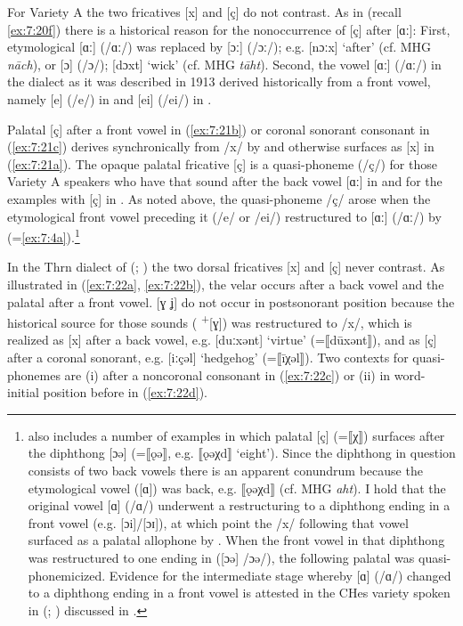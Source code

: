 For Variety A the two fricatives [x] and [ç] do not contrast. As in  (recall \ref{ex:7:20f}) there is a historical reason for the nonoccurrence of [ç] after [ɑː]: First, etymological [ɑː] (/ɑː/) was replaced by [ɔː] (/ɔː/); e.g. [nɔːx] ‘after’ (cf. MHG \textit{nāch}), or [ɔ] (/ɔ/); [dɔxt] ‘wick’ (cf. MHG \textit{tāht}). Second, the vowel [ɑː] (/ɑː/) in the dialect as it was described in 1913 derived historically from a front vowel, namely [e] (/e/) in  and [ei] (/ei/) in .

Palatal [ç] after a front vowel in (\ref{ex:7:21b}) or coronal sonorant consonant in (\ref{ex:7:21c}) derives synchronically from /x/ by  and otherwise surfaces as [x] in (\ref{ex:7:21a}). The opaque palatal fricative [ç] is a quasi-phoneme (/ç/) for those Variety A speakers who have that sound after the back vowel [ɑː] in  and for the examples with [ç] in . As noted above, the quasi-phoneme /ç/ arose when the etymological front vowel preceding it (/e/ or /ei/) restructured to [ɑː] (/ɑː/) by  (=\ref{ex:7:4a}).\footnote{\citet{Glöckner1913} also includes a number of examples in which palatal [ç] (=⟦χ⟧) surfaces after the diphthong [ɔə] (=⟦ǫə⟧, e.g. ⟦ǫəχd⟧ ‘eight’). Since the diphthong in question consists of two back vowels there is an apparent conundrum because the etymological vowel ([ɑ]) was back, e.g. ⟦ǫəχd⟧ (cf. MHG \textit{aht}). I hold that the original vowel [ɑ] (/ɑ/)  underwent a restructuring to a diphthong ending in a front vowel (e.g. [ɔi]/[ɔɪ]), at which point the /x/ following that vowel surfaced as a palatal allophone by . When the front vowel in that diphthong was restructured to one ending in  ([ɔə] /ɔə/), the following palatal was quasi-phonemicized. Evidence for the intermediate stage whereby [ɑ] (/ɑ/) changed to a diphthong ending in a front vowel is attested in the CHes variety spoken in  (\citealt{Friebertshäuser1961}; ) discussed in .}

In the Thrn dialect of  (\citealt{Schirmer1932}; ) the two dorsal fricatives [x] and [ç] never contrast. As illustrated in (\ref{ex:7:22a}, \ref{ex:7:22b}), the velar occurs after a back vowel and the palatal after a front vowel. [ɣ ʝ] do not occur in postsonorant position because the historical source for those sounds ( \textsuperscript{+}[ɣ]) was restructured to /x/, which is realized as [x] after a back vowel, e.g. [duːxənt] ‘virtue’ (=⟦dūxənt⟧), and as [ç] after a coronal sonorant, e.g. [iːçəl] ‘hedgehog’ (=⟦īχəl⟧). Two contexts for quasi-phonemes are (i) after a noncoronal consonant in (\ref{ex:7:22c}) or (ii) in word-initial position before  in (\ref{ex:7:22d}).

